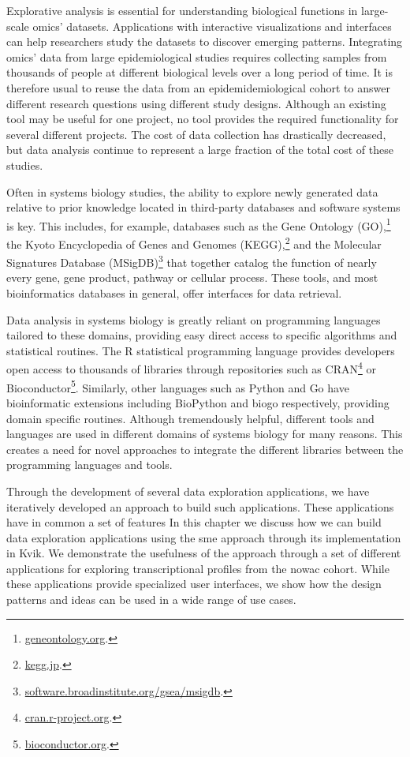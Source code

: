 Explorative analysis is essential for understanding biological functions in
large-scale omics' datasets. Applications with interactive visualizations and
interfaces can help researchers study the datasets to discover emerging
patterns.  Integrating omics' data from large epidemiological studies requires
collecting samples from thousands of people at different biological levels over
a long period of time. It is therefore usual to reuse the data from an
epidemidemiological cohort to answer different research questions using
different study designs. Although an existing tool may be useful for one
project, no tool provides the required functionality for several different
projects. The cost of data collection has drastically decreased, but data
analysis continue to represent a large fraction of the total cost of these
studies.\cite{sboner2011real}

Often in systems biology studies, the ability to explore newly generated data
relative to prior knowledge located in third-party databases and software
systems is key. This includes, for example, databases such as the Gene
Ontology (GO),\footnote{\url{geneontology.org}.} the Kyoto Encyclopedia of Genes
and Genomes (KEGG),\footnote{\url{kegg.jp}.} and the Molecular Signatures
Database (MSigDB)\footnote{\url{software.broadinstitute.org/gsea/msigdb}.} that
together catalog the function of nearly every gene, gene product, pathway or
cellular process. These tools, and most bioinformatics databases in general,
offer interfaces for data retrieval.

Data analysis in systems biology is greatly reliant on programming languages
tailored to these domains, providing easy direct access to specific
algorithms and statistical routines.  The R statistical programming language
provides developers open access to thousands of libraries through  repositories
such as CRAN\footnote{\url{cran.r-project.org}.} or
Bioconductor\footnote{\url{bioconductor.org}.}.  Similarly, other languages such
as  Python and Go have bioinformatic extensions including
BioPython\cite{biopython} and biogo\cite{biogo}  respectively, providing domain
specific routines.  Although  tremendously helpful, different tools and
languages are used in different domains of systems biology for many reasons.
This creates a need for novel approaches to integrate the different libraries
between the programming languages and tools.

Through the development of several data exploration applications, we have
iteratively developed an approach to build such applications. These applications
have in common a set of features In this chapter we discuss how we can build
data exploration applications using the \gls{sme} approach through its
implementation in Kvik. We demonstrate the usefulness of the approach through a
set of different applications for exploring transcriptional profiles from the
\gls{nowac} cohort. While these applications provide specialized user
interfaces, we show how the design patterns and ideas can be used in a wide
range of use cases. 

